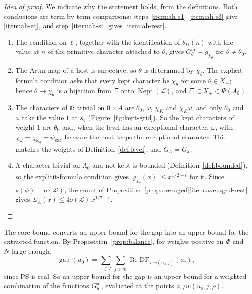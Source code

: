 \documentclass[11pt]{amsbook}
\theoremstyle{plain}
\theoremstyle{definition}
\theoremstyle{remark}
\numberwithin{equation}{section}
\numberwithin{figure}{chapter}
\numberwithin{table}{chapter}
\newcommand{\eps}{\varepsilon}
\newcommand{\lev}{\mathscr{L}}
\newcommand{\Kept}{\operatorname{Kept}}
\newcommand{\GG}{\mathfrak{G}}
\newcommand{\GPsi}{G^{\mathrm{ar}}}
\newcommand{\PS}{\mathrm{PS}}
\newcommand{\DF}{\mathrm{DF}}
\newcommand{\Top}{\mathcal{T}}
\newcommand{\gap}{\operatorname{gap}}
\begin{document}
\begin{proof}[Idea of proof]
We indicate why the statement holds, from the definitions. Both
conclusions are term-by-term comparisons:
steps~\ref{item:ah-s1}--\ref{item:ah-s3} give
\ref{item:ah-eq}, and step~\ref{item:ah-s4} gives \ref{item:ah-rest}.
\begin{enumerate}[label=(\arabic*)]
\item\label{item:ah-s1}
The condition on $\ell$, together with the identification of
$\theta_D(n)$ with the value at $n$ of the primitive character attached
to $\theta$, gives $\GPsi_\theta=g_{\chi_\theta}$ for $\theta\ne\theta_0$.
\item The Artin map of a host is surjective, so $\theta$ is determined by
$\chi_\theta$. The explicit-formula condition asks that every kept
character be $\chi_\theta$ for some $\theta\in X_+$; hence
$\theta\mapsto\chi_\theta$ is a bijection from $\Xi$ onto $\Kept(\lev)$,
and $\Xi\subset X_+\subset\Psi(A_0)$.
\item\label{item:ah-s3}
The characters of $\GG$ trivial on $0\times A$ are $\theta_0$,
$\omega$, $\chi_K$ and $\chi_K\omega$, and only $\theta_0$ and $\omega$
take the value $1$ at $s_0$ (Figure~\ref{fig:kept-grid}). So the kept characters of weight $1$ are
$\theta_0$ and, when the level has an exceptional character, $\omega$,
with $\chi_\omega=\chi_{\omega_q}=\psi_{\mathrm{exc}}$ because the host
keeps the exceptional character. This matches the weights of
Definition~\ref{def:level}, and $G_A=G_\lev$.
\item\label{item:ah-s4} A character trivial on $A_0$ and not kept is bounded
(Definition~\ref{def:bounded}), so the explicit-formula condition gives
$|g_{\chi_\theta}(x)|\le x^{1/2+\eps}$ for it. Since $o(\phi)=o(\lev)$,
the count of Proposition~\ref{prop:averaged}\ref{item:averaged-rest}
gives $\Sigma_A(x)\le4o(\lev)\,x^{1/2+\eps}$.
\end{enumerate}
\end{proof}

The core bound converts an upper bound for the gap into an upper bound
for the extracted function. By Proposition~\ref{prop:balance}, for
weights positive on $\Phi$ and $N$ large enough,
\[
\gap(u_0)=\sum_{\tau\in\Top}\sum_{j<m}\operatorname{Re}
\DF_{\tau,w(u_0,j)}(a_\tau),
\]
since $\PS$ is real. So an upper bound for the gap is an upper bound
for a weighted combination of the functions $\GPsi_\theta$, evaluated
at the points $a_\tau/w(u_0,j,\rho)$.
\end{document}
